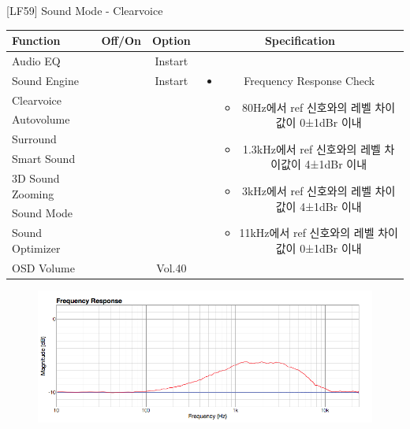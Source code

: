 \begin{frame}[t]{[LF59] Sound Mode - Clearvoice}
\begin{tiny}
\begin{tabular}{@{}lccc@{}}
\toprule
Function & Off/On & Option & Specification \\
\midrule
Audio EQ & \color{black}{Off} & Instart &
\multirow{10}{60mm}{
\begin{itemize}
\item Frequency Response Check
	\begin{itemize}
	\item 80Hz에서 ref 신호와의 레벨 차이값이 0±1dBr 이내
	\item 1.3kHz에서 ref 신호와의 레벨 차이값이 4±1dBr 이내
	\item 3kHz에서 ref 신호와의 레벨 차이값이 4±1dBr 이내
	\item 11kHz에서 ref 신호와의 레벨 차이값이 0±1dBr 이내
	\end{itemize}
\end{itemize}
} \\
Sound Engine & \color{blue}{On} & Instart & \\
Clearvoice & \color{black}{Off} & & \\
Autovolume & \color{black}{Off} & & \\
Surround & \color{black}{Off} & & \\
Smart Sound & \color{black}{Off} & & \\
3D Sound Zooming & \color{black}{Off} & & \\
Sound Mode & \color{blue}{On} & \color{blue}{News} & \\
Sound Optimizer & \color{black}{Off} & & \\
OSD Volume & \color{blue}{On} & Vol.40 & \\
\midrule
\end{tabular}
\end{tiny}

\begin{figure}[b]
\includegraphics[height=0.4\textwidth]{figures/Clearvoice.png}
\end{figure}

\end{frame}
